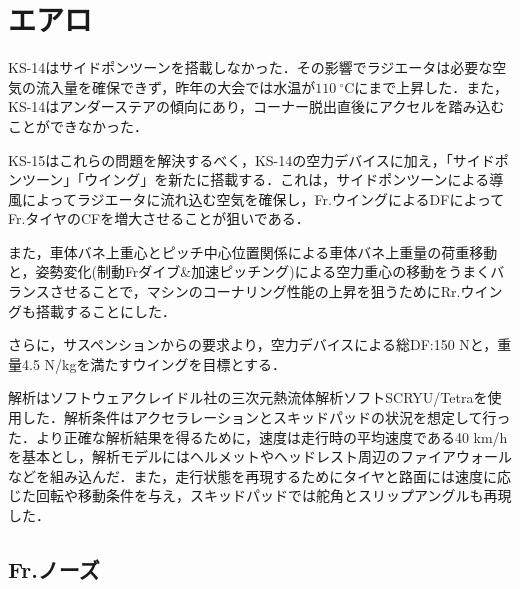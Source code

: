 \section{エアロ}
\label{sec:concept}
KS-14はサイドポンツーンを搭載しなかった．その影響でラジエータは必要な空気の流入量を確保できず，昨年の大会では水温が$110 \ {}^\circ\mathrm{C}$にまで上昇した．また，KS-14はアンダーステアの傾向にあり，コーナー脱出直後にアクセルを踏み込むことができなかった．


KS-15はこれらの問題を解決するべく，KS-14の空力デバイスに加え，「サイドポンツーン」「ウイング」を新たに搭載する．これは，サイドポンツーンによる導風によってラジエータに流れ込む空気を確保し，Fr.ウイングによるDFによってFr.タイヤのCFを増大させることが狙いである．

また，車体バネ上重心とピッチ中心位置関係による車体バネ上重量の荷重移動と，姿勢変化(制動Frダイブ\&加速ピッチング)による空力重心の移動をうまくバランスさせることで，マシンのコーナリング性能の上昇を狙うためにRr.ウイングも搭載することにした．

さらに，サスペンションからの要求より，空力デバイスによる総DF:150 Nと，重量4.5 N/kgを満たすウイングを目標とする．

解析はソフトウェアクレイドル社の三次元熱流体解析ソフトSCRYU/Tetraを使用した．解析条件はアクセラレーションとスキッドパッドの状況を想定して行った．より正確な解析結果を得るために，速度は走行時の平均速度である40 km/hを基本とし，解析モデルにはヘルメットやヘッドレスト周辺のファイアウォールなどを組み込んだ．また，走行状態を再現するためにタイヤと路面には速度に応じた回転や移動条件を与え，スキッドパッドでは舵角とスリップアングルも再現した．

\subsection{Fr.ノーズ}

